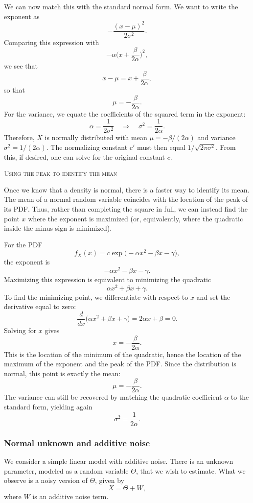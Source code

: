 We can now match this with the standard normal form.  
We want to write the exponent as
\[
-\frac{(x-\mu)^{2}}{2\sigma^{2}}.
\]
Comparing this expression with
\[
-\alpha\Big(x + \frac{\beta}{2\alpha}\Big)^{2},
\]
we see that
\[
x - \mu
=
x + \frac{\beta}{2\alpha},
\]
so that
\[
\mu
=
-\frac{\beta}{2\alpha}.
\]
For the variance, we equate the coefficients of the squared term in the exponent:
\[
\alpha
=
\frac{1}{2\sigma^{2}}
\quad\Rightarrow\quad
\sigma^{2}
=
\frac{1}{2\alpha}.
\]
Therefore, \(X\) is normally distributed with mean \(\mu = -\beta/(2\alpha)\) and variance \(\sigma^{2} = 1/(2\alpha)\).  
The normalizing constant \(c'\) must then equal \(1/\sqrt{2\pi\sigma^{2}}\).  
From this, if desired, one can solve for the original constant \(c\).

\bigskip
\textsc{Using the peak to identify the mean}

Once we know that a density is normal, there is a faster way to identify its mean.  
The mean of a normal random variable coincides with the location of the peak of its PDF.  
Thus, rather than completing the square in full, we can instead find the point \(x\) where the exponent is maximized (or, equivalently, where the quadratic inside the minus sign is minimized).

For the PDF
\[
f_{X}(x)
=
c \exp\big(-\alpha x^{2} - \beta x - \gamma\big),
\]
the exponent is
\[
-\alpha x^{2} - \beta x - \gamma.
\]
Maximizing this expression is equivalent to minimizing the quadratic
\[
\alpha x^{2} + \beta x + \gamma.
\]
To find the minimizing point, we differentiate with respect to \(x\) and set the derivative equal to zero:
\[
\frac{d}{dx}\big(\alpha x^{2} + \beta x + \gamma\big)
=
2\alpha x + \beta
=
0.
\]
Solving for \(x\) gives
\[
x
=
-\frac{\beta}{2\alpha}.
\]
This is the location of the minimum of the quadratic, hence the location of the maximum of the exponent and the peak of the PDF.  
Since the distribution is normal, this point is exactly the mean:
\[
\mu
=
-\frac{\beta}{2\alpha}.
\]
The variance can still be recovered by matching the quadratic coefficient \(\alpha\) to the standard form, yielding again
\[
\sigma^{2}
=
\frac{1}{2\alpha}.
\]


\subsubsection{Normal unknown and additive noise}

We consider a simple linear model with additive noise.  
There is an unknown parameter, modeled as a random variable \(\Theta\), that we wish to estimate.  
What we observe is a noisy version of \(\Theta\), given by
\[
X
=
\Theta + W,
\]
where \(W\) is an additive noise term.


